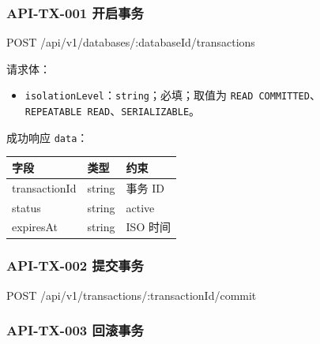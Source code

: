 \documentclass[
  a4paper,
  UTF8]{ctexart}
\newenvironment{Shaded}{}{}
\newcommand{\NormalTok}[1]{#1}
\providecommand{\tightlist}{%
  \setlength{\itemsep}{0pt}\setlength{\parskip}{0pt}}
\begin{document}
\hypertarget{api-tx-001-ux5f00ux542fux4e8bux52a1}{%
\subsubsection{API-TX-001
开启事务}\label{api-tx-001-ux5f00ux542fux4e8bux52a1}}

\begin{Shaded}
\begin{Highlighting}[]
\NormalTok{POST /api/v1/databases/:databaseId/transactions}
\end{Highlighting}
\end{Shaded}

请求体：

\begin{itemize}
\tightlist
\item
  \texttt{isolationLevel}：\texttt{string}；必填；取值为
  \texttt{READ\ COMMITTED}、\texttt{REPEATABLE\ READ}、\texttt{SERIALIZABLE}。
\end{itemize}

成功响应 \texttt{data}：

\begin{longtable}[]{@{}lll@{}}
\toprule
字段 & 类型 & 约束 \\
\midrule
\endhead
transactionId & string & 事务 ID \\
status & string & active \\
expiresAt & string & ISO 时间 \\
\bottomrule
\end{longtable}

\hypertarget{api-tx-002-ux63d0ux4ea4ux4e8bux52a1}{%
\subsubsection{API-TX-002
提交事务}\label{api-tx-002-ux63d0ux4ea4ux4e8bux52a1}}

\begin{Shaded}
\begin{Highlighting}[]
\NormalTok{POST /api/v1/transactions/:transactionId/commit}
\end{Highlighting}
\end{Shaded}

\hypertarget{api-tx-003-ux56deux6edaux4e8bux52a1}{%
\subsubsection{API-TX-003
回滚事务}\label{api-tx-003-ux56deux6edaux4e8bux52a1}}
\end{document}
